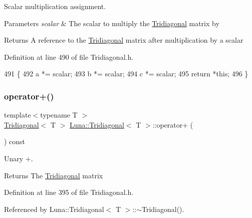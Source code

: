 Scalar multiplication assignment. 


\begin{DoxyParams}{Parameters}
{\em scalar} & The scalar to multiply the \hyperlink{classLuna_1_1Tridiagonal}{Tridiagonal} matrix by \\
\hline
\end{DoxyParams}
\begin{DoxyReturn}{Returns}
A reference to the \hyperlink{classLuna_1_1Tridiagonal}{Tridiagonal} matrix after multiplication by a scalar 
\end{DoxyReturn}


Definition at line 490 of file Tridiagonal.\+h.


\begin{DoxyCode}
491   \{
492     a *= scalar;
493     b *= scalar;
494     c *= scalar;
495     \textcolor{keywordflow}{return} *\textcolor{keyword}{this};
496   \}
\end{DoxyCode}
\mbox{\label{classLuna_1_1Tridiagonal_a654145a044a7fda0de429ece11915781}} 
\subsubsection{\texorpdfstring{operator+()}{operator+()}\hspace{0.1cm}{\footnotesize\ttfamily [1/2]}}
{\footnotesize\ttfamily template$<$typename T $>$ \\
\hyperlink{classLuna_1_1Tridiagonal}{Tridiagonal}$<$ T $>$ \hyperlink{classLuna_1_1Tridiagonal}{Luna\+::\+Tridiagonal}$<$ T $>$\+::operator+ (\begin{DoxyParamCaption}{ }\end{DoxyParamCaption}) const\hspace{0.3cm}{\ttfamily [inline]}}



Unary +. 

\begin{DoxyReturn}{Returns}
The \hyperlink{classLuna_1_1Tridiagonal}{Tridiagonal} matrix 
\end{DoxyReturn}


Definition at line 395 of file Tridiagonal.\+h.



Referenced by Luna\+::\+Tridiagonal$<$ T $>$\+::$\sim$\+Tridiagonal().


